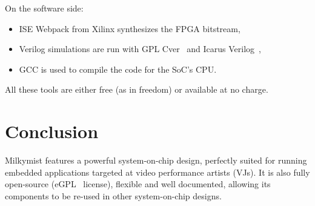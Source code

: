 \documentclass[a4paper,11pt,twocolumn]{paper}
\begin{document}
On the software side:
\begin{itemize}
\item ISE Webpack from Xilinx synthesizes the FPGA bitstream,
\item Verilog simulations are run with GPL Cver~\cite{gplcver} and Icarus Verilog~\cite{icarus},
\item GCC is used to compile the code for the SoC's CPU.
\end{itemize}

All these tools are either free (as in freedom) or available at no charge.

\section{Conclusion}
Milkymist features a powerful system-on-chip design, perfectly suited for running embedded applications targeted at video performance artists (VJs). It is also fully open-source (eGPL~\cite{egpl} license), flexible and well documented, allowing its components to be re-used in other system-on-chip designs.

{}

\end{document}
